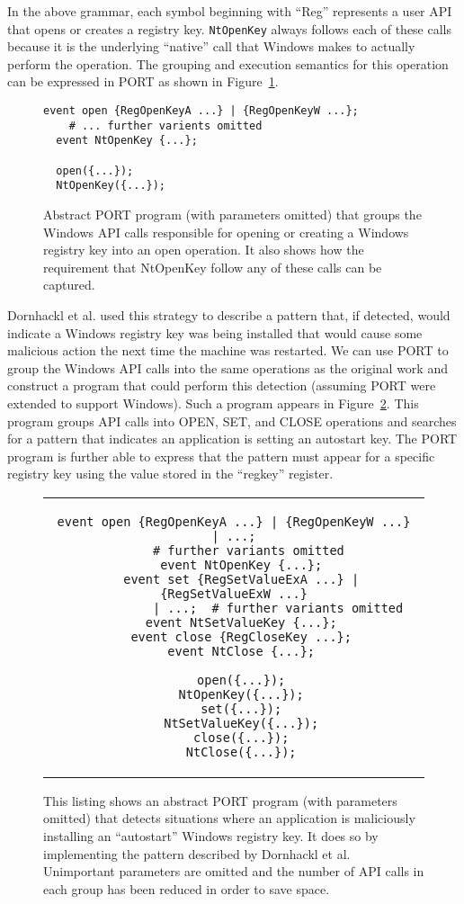 In the above grammar, each symbol beginning with ``Reg'' represents a user
API that opens or creates a registry key.  {\tt NtOpenKey} always follows
each of these calls because it is the underlying ``native'' call that
Windows makes to actually perform the operation.
The grouping and execution semantics for this operation can be expressed
in PORT as shown in Figure~\ref{lst:PORTOpenReg}.


\begin{figure}[H]
\begin{lstlisting}[gobble=2]
  event open {RegOpenKeyA ...} | {RegOpenKeyW ...};
    # ... further varients omitted
  event NtOpenKey {...};

  open({...});
  NtOpenKey({...});
\end{lstlisting}
  \caption{Abstract PORT program (with parameters
  omitted) that groups the Windows API calls responsible for opening or
  creating a Windows registry key into an open operation.  It also shows
  how the requirement that NtOpenKey follow any of these calls can be
  captured.}
\label{lst:PORTOpenReg}
\end{figure}

Dornhackl et al. used this strategy to describe a pattern that, if
detected, would indicate
a Windows registry key was being installed
that would cause some malicious action
the next time the machine was restarted.  We can use PORT to group the
Windows API calls into the same operations as the original work and
construct a program that could perform this detection (assuming PORT were
extended to support Windows).  Such a program appears in
Figure~\ref{lst:PORTRegDetect}.  This program groups API calls into OPEN,
SET, and CLOSE operations and searches for a pattern that
indicates
an application is
setting an autostart key.  The PORT program is further able to express
that the pattern must appear for a specific registry key using the value
stored in the ``regkey'' register.

\begin{figure}[H]
\centering
\begin{tabular}{c}
\begin{lstlisting}[gobble=2]
  event open {RegOpenKeyA ...} | {RegOpenKeyW ...} | ...;
    # further variants omitted
  event NtOpenKey {...};
  event set {RegSetValueExA ...} | {RegSetValueExW ...}
            | ...;  # further variants omitted
  event NtSetValueKey {...};
  event close {RegCloseKey ...};
  event NtClose {...};

  open({...});
  NtOpenKey({...});
  set({...});
  NtSetValueKey({...});
  close({...});
  NtClose({...});
\end{lstlisting}
\end{tabular}
  \caption{This listing shows an abstract PORT program (with parameters
  omitted) that detects situations where an application is maliciously
  installing an ``autostart'' Windows registry key.  It does so by
  implementing the pattern described by Dornhackl et al.  Unimportant
  parameters are omitted and the number of API calls in each group has been
  reduced in order to save space.}
\label{lst:PORTRegDetect}
\end{figure}


